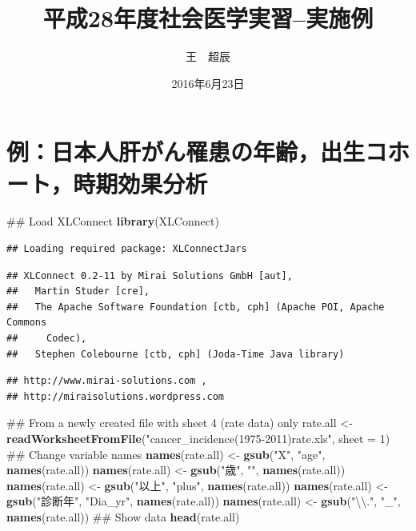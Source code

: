 \documentclass[11pt,]{article}
\title{平成28年度社会医学実習--実施例}
\author{王　超辰}
\date{2016年6月23日}
\newenvironment{Shaded}{\begin{snugshade}}{\end{snugshade}}
\newcommand{\KeywordTok}[1]{\textcolor[rgb]{0.13,0.29,0.53}{\textbf{{#1}}}}
\newcommand{\DataTypeTok}[1]{\textcolor[rgb]{0.13,0.29,0.53}{{#1}}}
\newcommand{\DecValTok}[1]{\textcolor[rgb]{0.00,0.00,0.81}{{#1}}}
\newcommand{\CharTok}[1]{\textcolor[rgb]{0.31,0.60,0.02}{{#1}}}
\newcommand{\StringTok}[1]{\textcolor[rgb]{0.31,0.60,0.02}{{#1}}}
\newcommand{\NormalTok}[1]{{#1}}
\begin{document}
\maketitle

\section{例：日本人肝がん罹患の年齢，出生コホート，時期効果分析}

\begin{Shaded}
\begin{Highlighting}[]
\NormalTok{## Load XLConnect}
\KeywordTok{library}\NormalTok{(XLConnect)}
\end{Highlighting}
\end{Shaded}

\begin{verbatim}
## Loading required package: XLConnectJars
\end{verbatim}

\begin{verbatim}
## XLConnect 0.2-11 by Mirai Solutions GmbH [aut],
##   Martin Studer [cre],
##   The Apache Software Foundation [ctb, cph] (Apache POI, Apache Commons
##     Codec),
##   Stephen Colebourne [ctb, cph] (Joda-Time Java library)
\end{verbatim}

\begin{verbatim}
## http://www.mirai-solutions.com ,
## http://miraisolutions.wordpress.com
\end{verbatim}

\begin{Shaded}
\begin{Highlighting}[]
\NormalTok{## From a newly created file with sheet 4 (rate data) only}
\NormalTok{rate.all <-}\StringTok{ }\KeywordTok{readWorksheetFromFile}\NormalTok{(}\StringTok{"cancer_incidence(1975-2011)rate.xls"}\NormalTok{,}
                                  \DataTypeTok{sheet =} \DecValTok{1}\NormalTok{)}
\NormalTok{## Change variable names}
\KeywordTok{names}\NormalTok{(rate.all) <-}\StringTok{ }\KeywordTok{gsub}\NormalTok{(}\StringTok{"X"}\NormalTok{, }\StringTok{"age"}\NormalTok{, }\KeywordTok{names}\NormalTok{(rate.all))}
\KeywordTok{names}\NormalTok{(rate.all) <-}\StringTok{ }\KeywordTok{gsub}\NormalTok{(}\StringTok{"歳"}\NormalTok{, }\StringTok{""}\NormalTok{, }\KeywordTok{names}\NormalTok{(rate.all))}
\KeywordTok{names}\NormalTok{(rate.all) <-}\StringTok{ }\KeywordTok{gsub}\NormalTok{(}\StringTok{"以上"}\NormalTok{, }\StringTok{"plus"}\NormalTok{, }\KeywordTok{names}\NormalTok{(rate.all))}
\KeywordTok{names}\NormalTok{(rate.all) <-}\StringTok{ }\KeywordTok{gsub}\NormalTok{(}\StringTok{"診断年"}\NormalTok{, }\StringTok{"Dia_yr"}\NormalTok{, }\KeywordTok{names}\NormalTok{(rate.all))}
\KeywordTok{names}\NormalTok{(rate.all) <-}\StringTok{ }\KeywordTok{gsub}\NormalTok{(}\StringTok{"}\CharTok{\textbackslash{}\textbackslash{}}\StringTok{."}\NormalTok{, }\StringTok{"_"}\NormalTok{, }\KeywordTok{names}\NormalTok{(rate.all))}
\NormalTok{## Show data}
\KeywordTok{head}\NormalTok{(rate.all)}
\end{Highlighting}
\end{Shaded}
\end{document}
